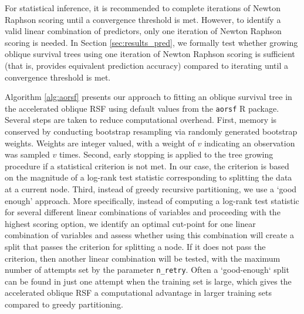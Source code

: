 \documentclass[twoside,11pt]{article}\usepackage[]{graphicx}\usepackage[]{xcolor}
\newcommand{\ie}{that is}
\newcommand{\secref}[1]{Section \ref{#1}}
\begin{document}
For statistical inference, it is recommended to complete iterations of Newton Raphson scoring until a convergence threshold is met. However, to identify a valid linear combination of predictors, only one iteration of Newton Raphson scoring is needed. In \secref{sec:results_pred}, we formally test whether growing oblique survival trees using one iteration of Newton Raphson scoring is sufficient (\ie, provides equivalent prediction accuracy) compared to iterating until a convergence threshold is met.

Algorithm \ref{alg:aorsf} presents our approach to fitting an oblique survival tree in the accelerated oblique RSF using default values from the \texttt{aorsf} R package. Several steps are taken to reduce computational overhead. First, memory is conserved by conducting bootstrap resampling via randomly generated bootstrap weights. Weights are integer valued, with a weight of $v$ indicating an observation was sampled $v$ times. Second, early stopping is applied to the tree growing procedure if a statistical criterion is not met. In our case, the criterion is based on the magnitude of a log-rank test statistic corresponding to splitting the data at a current node. Third, instead of greedy recursive partitioning, we use a `good enough' approach. More specifically, instead of computing a log-rank test statistic for several different linear combinations of variables and proceeding with the highest scoring option, we identify an optimal cut-point for one linear combination of variables and assess whether using this combination will create a split that passes the criterion for splitting a node. If it does not pass the criterion, then another linear combination will be tested, with the maximum number of attempts set by the parameter \texttt{n\_retry}. Often a `good-enough` split can be found in just one attempt when the training set is large, which gives the accelerated oblique RSF a computational advantage in larger training sets compared to greedy partitioning.
\end{document}
